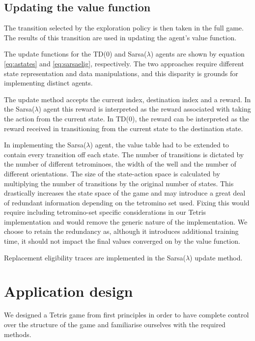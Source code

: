 \documentclass{rucsthesis}
\begin{document}
\subsection{Updating the value function}

The transition selected by the exploration policy is then taken in the full game. The results of this transition are used in updating the agent's value function.

The update functions for the TD(0) and Sarsa($\lambda$) agents are shown by equation \ref{eq:astates} and \ref{eq:sarsaelig}, respectively. The two approaches require different state representation and data manipulations, and this disparity is grounds for implementing distinct agents. 

The update method accepts the current index, destination index and a reward. In the Sarsa($\lambda$) agent this reward is interpreted as the reward associated with taking the action from the current state. In TD(0), the reward can be interpreted as the reward received in transitioning from the current state to the destination state.

In implementing the Sarsa($\lambda$) agent, the value table had to be extended to contain every transition off each state. The number of transitions is dictated by the number of different tetrominoes, the width of the well and the number of different orientations.  The size of the state-action space is calculated by multiplying the number of transitions by the original number of states. This drastically increases the state space of the game and may introduce a great deal of redundant information depending on the tetromino set used. Fixing this would require including tetromino-set specific considerations in our Tetris implementation and would remove the generic nature of the implementation. We choose to retain the redundancy as, although it introduces additional training time, it should not impact the final values converged on by the value function.

Replacement eligibility traces are implemented in the Sarsa($\lambda$) update method. 

\section{Application design}

We designed a Tetris game from first principles in order to have complete control over the structure of the game and familiarise ourselves with the required methods.
\end{document}

